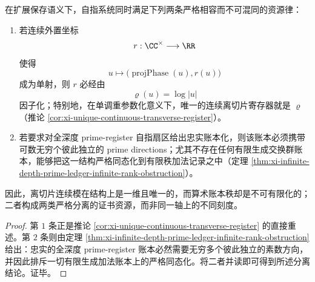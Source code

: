 \begin{theorem}[唯一连续横截与无限素数秩的严格分离]\label{thm:xi-unique-transverse-vs-infinite-prime-rank-separation}
在扩展保存语义下，自指系统同时满足下列两条严格相容而不可混同的资源律：
\begin{enumerate}
  \item 若连续外置坐标
  \[
  r:\CC^\times\longrightarrow \RR
  \]
  使得
  \[
  u\longmapsto \bigl(\operatorname{projPhase}(u),r(u)\bigr)
  \]
  成为单射，则 \(r\) 必经由
  \[
  \varrho(u)=\log|u|
  \]
  因子化；特别地，在单调重参数化意义下，唯一的连续离切片寄存器就是 \(\varrho\)（推论 \ref{cor:xi-unique-continuous-transverse-register}）。
  \item 若要求对全深度 prime-register 自指扇区给出忠实账本化，则该账本必须携带可数无穷个彼此独立的 prime directions；尤其不存在任何有限生成交换群账本，能够把这一结构严格同态化到有限秩加法记录之中（定理 \ref{thm:xi-infinite-depth-prime-ledger-infinite-rank-obstruction}）。
\end{enumerate}
因此，离切片连续模在结构上是一维且唯一的，而算术账本秩却是不可有限化的；二者构成两类严格分离的证书资源，而非同一轴上的不同刻度。
\end{theorem}
\begin{proof}
第 \(1\) 条正是推论 \ref{cor:xi-unique-continuous-transverse-register} 的直接重述。第 \(2\) 条则由定理 \ref{thm:xi-infinite-depth-prime-ledger-infinite-rank-obstruction} 给出：忠实的全深度 prime-register 账本必然需要无穷多个彼此独立的素数方向，并因此排斥一切有限生成加法账本上的严格同态化。将二者并读即可得到所述分离结论。证毕。
\end{proof}

